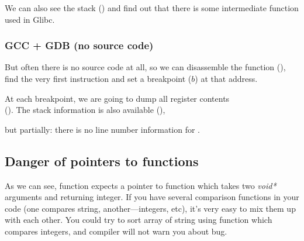 We can also see the stack () and find out that there is some intermediate function  used in Glibc.



\subsubsection{GCC + GDB (no source code)}

But often there is no source code at all, so we can disassemble the \comp function (), find the very first
\CMP instruction and set a breakpoint ($b$) at that address.

At each breakpoint, we are going to dump all register contents\\
().
The stack information is also available (), 

but partially: there is no line number information for \comp.



\subsection{Danger of pointers to functions}

As we can see, \qsort function expects a pointer to function which takes two \emph{void*} arguments and
returning integer.
If you have several comparison functions in your code (one compares string, another---integers, etc), it's very easy to
mix them up with each other.
You could try to sort array of string using function which compares integers, and compiler will not warn you about bug.

